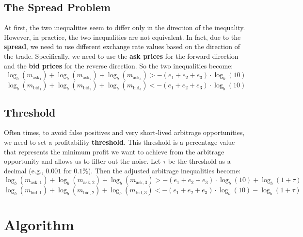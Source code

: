 \documentclass[11pt]{article}
\begin{document}
\subsection{The Spread Problem}
At first, the two inequalities seem to differ only in the direction of the inequality. However, in practice, the two inequalities are not equivalent. In fact, due to the \textbf{spread}, we need to use different exchange rate values based on the direction of the trade. Specifically, we need to use the \textbf{ask prices} for the forward direction and the \textbf{bid prices} for the reverse direction. So the two inequalities become:
\setcounter{equation}{0}
\begin{equation}
    \log_b(m_{\text{ask}_1}) + \log_b(m_{\text{ask}_2}) + \log_b(m_{\text{ask}_3}) > 
    -\left(e_1 + e_2 + e_3\right) \cdot \log_b(10)
\end{equation}
\begin{equation}
    \log_b(m_{\text{bid}_1}) + \log_b(m_{\text{bid}_2}) + \log_b(m_{\text{bid}_3}) < 
    -\left(e_1 + e_2 + e_3\right) \cdot \log_b(10)
\end{equation}

\subsection{Threshold}
Often times, to avoid false positives and very short-lived arbitrage opportunities, we need to set a profitability \textbf{threshold}. This threshold is a percentage value that represents the minimum profit we want to achieve from the arbitrage opportunity and allows us to filter out the noise.
Let $\tau$ be the threshold as a decimal (e.g., $0.001$ for $0.1\%$). Then the adjusted arbitrage inequalities become:
\begin{equation}
    \log_b(m_{\text{ask},1}) + \log_b(m_{\text{ask},2}) + \log_b(m_{\text{ask},3}) >
    -\left(e_1 + e_2 + e_3\right) \cdot \log_b(10) + \log_b(1 + \tau)
\end{equation}
\begin{equation}
    \log_b(m_{\text{bid},1}) + \log_b(m_{\text{bid},2}) + \log_b(m_{\text{bid},3}) <
    -\left(e_1 + e_2 + e_3\right) \cdot \log_b(10) - \log_b(1 + \tau)
\end{equation}

\section{Algorithm}
\end{document}
